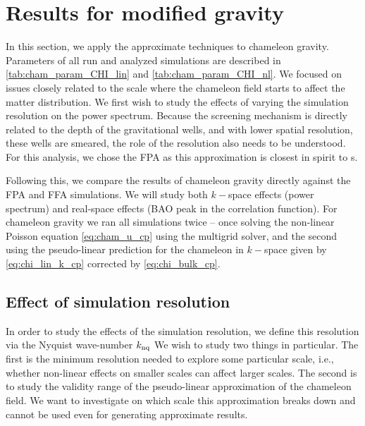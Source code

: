 \section{Results for modified gravity}
\newcommand{\chileft}{\hspace*{-1cm}}
In this section, we apply the approximate techniques to chameleon gravity. Parameters of all run and analyzed simulations are described in \autoref{tab:cham_param_CHI_lin} and \autoref{tab:cham_param_CHI_nl}. We focused on issues closely related to the scale where the chameleon field starts to affect the matter distribution. We first wish to study the effects of varying the simulation resolution on the power spectrum. Because the screening mechanism is directly related to the depth of the gravitational wells, and with lower spatial resolution, these wells are smeared, the role of the resolution also needs to be understood. For this analysis, we chose the FPA as this approximation is closest in spirit to \nbodysim s.

Following this, we compare the results of chameleon gravity directly against the FPA and FFA simulations. %
We will study both $k-$space effects (power spectrum) and real-space effects (BAO peak in the correlation function). For chameleon gravity we ran all simulations twice -- once solving the non-linear Poisson equation \eqref{eq:cham_u_cp} using the multigrid solver, and the second using the pseudo-linear prediction for the chameleon in $k-$space given by \eqref{eq:chi_lin_k_cp} corrected by \eqref{eq:chi_bulk_cp}.

\subsection{Effect of simulation resolution}
In order to study the effects of the simulation resolution, we define this resolution via the Nyquist wave-number $k_{\rm nq}$
We wish to study two things in particular. The first is the minimum resolution needed to explore some particular scale, i.e., whether non-linear effects on smaller scales can affect larger scales. The second is to study the validity range of the pseudo-linear approximation of the chameleon field. We want to investigate on which scale this approximation breaks down and cannot be used even for generating approximate results.

